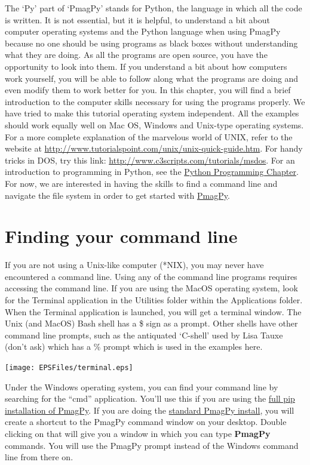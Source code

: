 \documentclass[11pt]{book}
\begin{document}
{The `Py' part of  `PmagPy' stands for Python, the language in which all the code is written.   It is not essential, but it is helpful, to understand a bit about computer operating systems and the Python language when using PmagPy because no one should be using programs as black boxes without understanding what they are doing. As all the programs are open source, you have the opportunity to look into them.  If you understand a bit about how computers work yourself, you will be able to follow along what the programs are doing and even modify them to work better for you. In this chapter, you will find a brief introduction to the computer skills necessary for using the programs properly.  We have tried to make this tutorial operating system independent.  All the examples should work equally well on Mac OS, Windows and Unix-type operating systems.  For a more complete explanation of the marvelous world of UNIX, refer to the website at \url{http://www.tutorialspoint.com/unix/unix-quick-guide.htm}.  For handy tricks in DOS, try this link:  \url{http://www.c3scripts.com/tutorials/msdos}.
For an introduction to programming in Python, see the \href{#Python}{Python Programming Chapter}.   For now, we are interested in having the skills to find a command line and navigate the file system in order to get started with \href{#PmagPy}{PmagPy}.


\section{Finding your command line}
If you are not using a Unix-like computer (*NIX), you may never have encountered a command line. Using any of the command line programs requires accessing the command line.  If you are using the MacOS operating system, look for the Terminal application in the Utilities folder within the Applications folder. When the Terminal application is launched, you will get a terminal window. The Unix (and MacOS) Bash shell has a \$ sign as a prompt.  Other shells have other command line prompts, such as the antiquated `C-shell' used by Lisa Tauxe (don't ask) which has a \% prompt which is used in the examples here.

  \texttt{[image: EPSFiles/terminal.eps]}

Under the Windows operating system, you can find your command line by searching for the ``cmd'' application. You'll use this if you are using the \href{#full_pip}{full pip installation of PmagPy}. If you are doing the \href{#full_install}{standard PmagPy install}, you will create a shortcut to the PmagPy command window on your desktop.  Double clicking on that will give you a window in which you can type {\bf PmagPy} commands.  You will use the PmagPy prompt instead of the Windows command line from there on.

}
\end{document}

